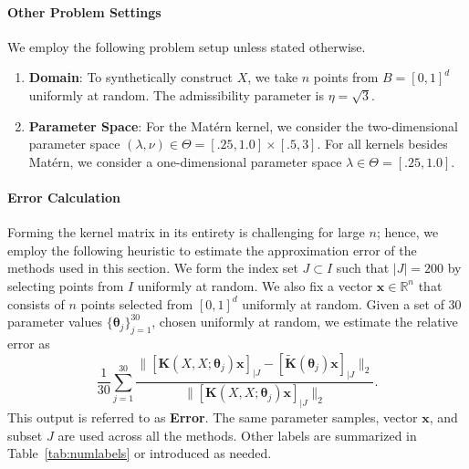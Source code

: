 \documentclass[final,3p,times]{elsarticle}
\renewcommand{\vec}[1]{\boldsymbol{#1}}
\newcommand{\mat}[1]{\boldsymbol{#1}}
\newcommand{\R}{\mathbb{R}}
\begin{document}
\paragraph{Other Problem Settings} We employ the following problem setup unless stated otherwise.
\begin{enumerate}
    \item \textbf{Domain}: To synthetically construct ${X}$, we take $n$ points from $B = [0,1]^{d}$ uniformly at random. The admissibility parameter is $\eta = \sqrt{3}$.

    \item \textbf{Parameter Space}:  For the Mat\'ern kernel, we consider the two-dimensional parameter space $(\lambda, \nu) \in \Theta  = [.25, 1.0] \times [.5, 3]$. For all kernels besides Mat\'ern, we consider a one-dimensional parameter space $\lambda \in \Theta = [.25, 1.0]$.
\end{enumerate}


\paragraph{Error Calculation}
Forming the kernel matrix in its entirety is challenging for large $n$; hence, we employ the following heuristic to estimate the approximation error of the methods used in this section.   We form the index set $J  \subset I$ such that $|J| = 200$ by selecting points from $I$ uniformly at random.  We also fix a vector $\vec{x} \in \R^{n}$ that consists of $n$ points selected from $[0, 1]^{d}$ uniformly at random.
 Given a set of $30$ parameter values $\{\vec{\theta}_j\}_{j=1}^{30}$, chosen uniformly at random, we estimate the relative error as 
\[ \frac{1}{30}\sum_{j= 1}^{30} \frac{\|[\mat{K}(X,X;\vec\theta_j)\vec{x}]_{|J} - [\widetilde{\mat{K}}(\vec\theta_j)\vec{x}]_{|J} \|_2 }{ \|[\mat{K}(X,X;\vec\theta_j)\vec{x}]_{|J} \|_2 }.\]
 This output is referred to as \textbf{Error}. The same parameter samples, vector $\vec{x}$, and subset $J$ are used across all the methods. Other labels are summarized in Table~\ref{tab:numlabels} or introduced as needed.
\end{document}

